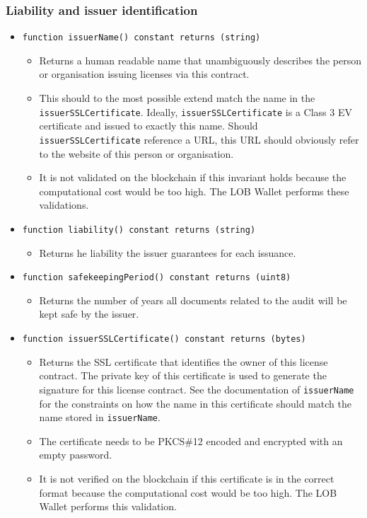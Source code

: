 \documentclass[a4paper]{article}
\begin{document}
\subsubsection{Liability and issuer identification}

\begin{itemize}
  \item \texttt{function issuerName() constant returns (string)}
  \begin{itemize}
    \item Returns a human readable name that unambiguously describes the person or organisation issuing licenses via this contract.
    \item This should to the most possible extend match the name in the \texttt{issuerSSLCertificate}. Ideally, \texttt{issuerSSLCertificate} is a Class 3 EV certificate and issued to exactly this name. Should \texttt{issuerSSLCertificate} reference a URL, this URL should obviously refer to the website of this person or organisation.
    \item It is not validated on the blockchain if this invariant holds because the computational cost would be too high. The LOB Wallet performs these validations.
  \end{itemize}
  
  \item \texttt{function liability() constant returns (string)}
  \begin{itemize}
    \item Returns he liability the issuer guarantees for each issuance.
  \end{itemize}
  
  \item \texttt{function safekeepingPeriod() constant returns (uint8)}
  \begin{itemize}
    \item Returns the number of years all documents related to the audit will be kept safe by the issuer.
  \end{itemize}
  
  \item \texttt{function issuerSSLCertificate() constant returns (bytes)}
  \begin{itemize}
    \item Returns the SSL certificate that identifies the owner of this license contract. The private key of this certificate is used to generate the signature for this license contract. See the documentation of \texttt{issuerName} for the  constraints on how the name in this certificate should match the name  stored in \texttt{issuerName}.
    \item The certificate needs to be PKCS\#12 encoded and encrypted with an empty password.
    \item It is not verified on the blockchain if this certificate is in the correct format because the computational cost would be too high. The LOB Wallet performs this validation.
  \end{itemize}
  

\end{itemize}
\end{document}
